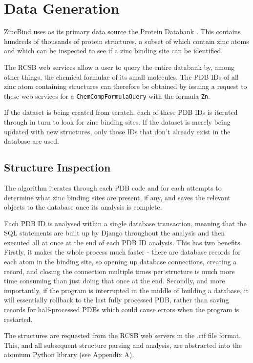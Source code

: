 \section{Data Generation}

ZincBind uses as its primary data source the Protein Databank . This contains hundreds of thousands of protein structures, a subset of which contain zinc atoms and which can be inspected to see if a zinc binding site can be identified.

The RCSB web services allow a user to query the entire databank by, among other things, the chemical formulae of its small molecules. The PDB IDs of all zinc atom containing structures can therefore be obtained by issuing a request to these web services for a \verb|ChemCompFormulaQuery| with the formula \verb|Zn|.

If the dataset is being created from scratch, each of these PDB IDs is iterated through in turn to look for zinc binding sites. If the dataset is merely being updated with new structures, only those IDs that don't already exist in the database are used.

\subsection{Structure Inspection}

The algorithm iterates through each PDB code and for each attempts to determine what zinc binding sites are present, if any, and saves the relevant objects to the database once its analysis is complete.

Each PDB ID is analysed within a single database transaction, meaning that the SQL statements are built up by Django throughout the analysis and then executed all at once at the end of each PDB ID analysis. This has two benefits. Firstly, it makes the whole process much faster - there are database records for each atom in the binding site, so opening up database connections, creating a record, and closing the connection multiple times per structure is much more time consuming than just doing that once at the end. Secondly, and more importantly, if the program is interrupted in the middle of building a database, it will essentially rollback to the last fully processed PDB, rather than saving records for half-processed PDBs which could cause errors when the program is restarted.

The structures are requested from the RCSB web servers in the .cif file format. This, and all subsequent structure parsing and analysis, are abstracted into the atomium Python library (see Appendix A).

